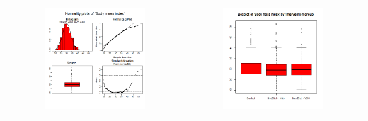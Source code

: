 \documentclass{article}
\begin{document}
\begin{center}
\begin{tabular}{cc}
\includegraphics[width=0.6\textwidth]{example2c.png} & \includegraphics[width=0.6\textwidth]{example2d.png} \\
\end{tabular}
\end{center}
\end{document}
